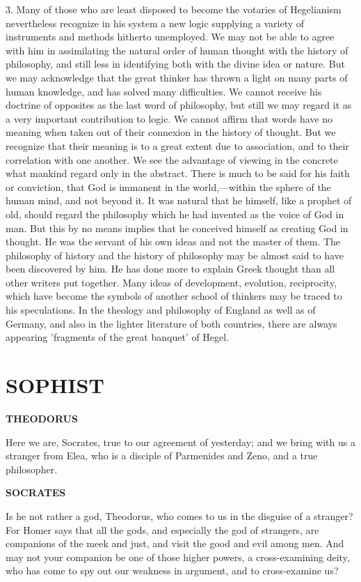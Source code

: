 \documentclass[11pt,letter]{article}
\begin{document}
\par  3. Many of those who are least disposed to become the votaries of Hegelianism nevertheless recognize in his system a new logic supplying a variety of instruments and methods hitherto unemployed. We may not be able to agree with him in assimilating the natural order of human thought with the history of philosophy, and still less in identifying both with the divine idea or nature. But we may acknowledge that the great thinker has thrown a light on many parts of human knowledge, and has solved many difficulties. We cannot receive his doctrine of opposites as the last word of philosophy, but still we may regard it as a very important contribution to logic. We cannot affirm that words have no meaning when taken out of their connexion in the history of thought. But we recognize that their meaning is to a great extent due to association, and to their correlation with one another. We see the advantage of viewing in the concrete what mankind regard only in the abstract. There is much to be said for his faith or conviction, that God is immanent in the world,—within the sphere of the human mind, and not beyond it. It was natural that he himself, like a prophet of old, should regard the philosophy which he had invented as the voice of God in man. But this by no means implies that he conceived himself as creating God in thought. He was the servant of his own ideas and not the master of them. The philosophy of history and the history of philosophy may be almost said to have been discovered by him. He has done more to explain Greek thought than all other writers put together. Many ideas of development, evolution, reciprocity, which have become the symbols of another school of thinkers may be traced to his speculations. In the theology and philosophy of England as well as of Germany, and also in the lighter literature of both countries, there are always appearing 'fragments of the great banquet' of Hegel.

\par 
\section{
      SOPHIST
    } 
\par \textbf{THEODORUS}
\par   Here we are, Socrates, true to our agreement of yesterday; and we bring with us a stranger from Elea, who is a disciple of Parmenides and Zeno, and a true philosopher.

\par \textbf{SOCRATES}
\par   Is he not rather a god, Theodorus, who comes to us in the disguise of a stranger? For Homer says that all the gods, and especially the god of strangers, are companions of the meek and just, and visit the good and evil among men. And may not your companion be one of those higher powers, a cross-examining deity, who has come to spy out our weakness in argument, and to cross-examine us?
\end{document}

